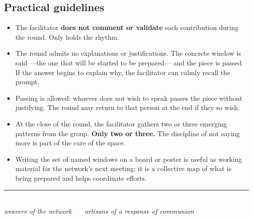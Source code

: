 \documentclass[11pt, a4paper]{article}
\begin{document}
\subsection*{Practical guidelines}

\begin{itemize}
  \item The facilitator \textbf{does not comment or validate} each contribution during the round. Only holds the rhythm.
  \item The round admits no explanations or justifications. The concrete window is said ---the one that will be started to be prepared--- and the piece is passed. If the answer begins to explain why, the facilitator can calmly recall the prompt.
  \item Passing is allowed: whoever does not wish to speak passes the piece without justifying. The round may return to that person at the end if they so wish.
  \item At the close of the round, the facilitator gathers two or three emerging patterns from the group. \textbf{Only two or three.} The discipline of not saying more is part of the care of the space.
  \item Writing the set of named windows on a board or poster is useful as working material for the network's next meeting: it is a collective map of what is being prepared and helps coordinate efforts.
\end{itemize}

\vspace{2em}

\begin{center}
{\color{regla}\rule{0.35\linewidth}{0.5pt}}\\
\vspace{0.6em}
{\color{tenue}\itshape\small weavers of the network \ \textbullet\ \ artisans of a response of communion}
\end{center}
\end{document}
